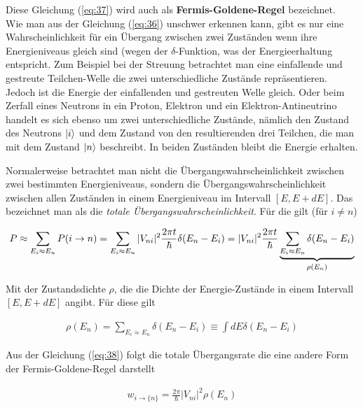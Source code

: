 Diese Gleichung (\ref{eq:37}) wird auch als \textbf{Fermis-Goldene-Regel} bezeichnet.
\\
Wie man aus der Gleichung (\ref{eq:36}) unschwer erkennen kann, gibt es nur eine Wahrscheinlichkeit für ein Übergang zwischen zwei Zuständen wenn ihre Energieniveaus gleich sind (wegen der \(\delta\)-Funktion, was der Energieerhaltung entspricht. Zum Beispiel bei der Streuung betrachtet man eine einfallende und gestreute Teilchen-Welle die zwei unterschiedliche Zustände repräsentieren. Jedoch ist die Energie der einfallenden und gestreuten Welle gleich. Oder beim Zerfall eines Neutrons in ein Proton, Elektron und ein Elektron-Antineutrino handelt es sich ebenso um zwei unterschiedliche Zustände, nämlich den Zustand des Neutrons \(\left| i \right\rangle\) und dem Zustand von den resultierenden drei Teilchen, die man mit dem Zustand \(\left| n \right\rangle\) beschreibt. In beiden Zuständen bleibt die Energie erhalten.

Normalerweise betrachtet man nicht die Übergangswahrscheinlichkeit zwischen zwei bestimmten Energieniveaus, sondern die Übergangswahrscheinlichkeit zwischen allen Zuständen in einem Energieniveau im Intervall \([E,E+dE]\). Das bezeichnet man als die \textit{totale Übergangswahrscheinlichkeit}. Für die gilt (für \(i\ne n\))

\begin{align}
  \label{eq:38}
  P\approx \sum_{E_i\approx E_n} P(i\rightarrow n) = \sum_{E_i\approx E_n} |V_{ni}|^2 \frac{2\pi t}{\hbar} \delta(E_n-E_i) =  |V_{ni}|^2 \frac{2\pi t}{\hbar} \underbr{ \sum_{E_i\approx E_n}\delta(E_n-E_i)}_{\rho(E_n) }
\end{align}

Mit der Zustandsdichte \(\rho\), die die Dichte der Energie-Zustände in einem Intervall \([E,E+dE]\) angibt. Für diese gilt

\begin{align}
  \label{eq:39}
  \rho(E_n) = \sum_{E_i\approx E_n}\delta(E_n-E_i) \equiv \int dE \delta(E_n-E_i)
\end{align}

Aus der Gleichung (\ref{eq:38}) folgt die totale Übergangsrate die eine andere Form der Fermis-Goldene-Regel darstellt

\begin{align}
  \label{eq:40}
  \boxed{  w_{i\to \{n\}}= \frac{2\pi }{\hbar} |V_{ni}|^2  \rho(E_n) }
\end{align}


